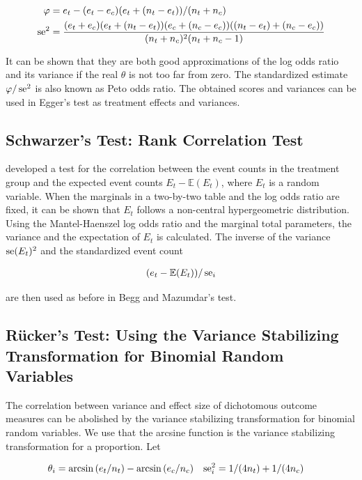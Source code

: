 \documentclass[11pt,a4paper,twoside]{book}\usepackage[]{graphicx}\usepackage[]{color}
\begin{document}
\begin{align}
\varphi &= e_t - (e_t - e_c)(e_t + (n_t - e_t))/(n_t + n_c) \nonumber \\
 \operatorname{se}^2 &= \frac{(e_t + e_c)(e_t + (n_t - e_t))(e_c + (n_c - e_c))((n_t - e_t) + (n_c - e_c))}{(n_t + n_c)^2(n_t + n_c - 1)} \nonumber
\end{align}

It can be shown that they are both good approximations of the log odds ratio and its variance if the real $\theta$ is not too far from zero. The standardized estimate $\varphi/\operatorname{se}^2$ is also known as Peto odds ratio. The obtained scores and variances can be used in Egger's test as treatment effects and variances.


\subsection{Schwarzer's Test: Rank Correlation Test} \label{sec:Schwarzer}
\citealp{Schwarzer} developed a test for the correlation between the event counts in the treatment group and the expected event counts $E_t - \mathbb{E}(E_t)$, where $E_t$ is a random variable. When the marginals in a two-by-two table and the log odds ratio are fixed, it can be shown that $E_t$ follows a non-central hypergeometric distribution. Using the Mantel-Haenszel log odds ratio and the marginal total parameters, the variance and the expectation of $E_t$ is calculated. The inverse of the variance $\operatorname{se}(E_t)^2$ and the standardized event count

\begin{align}
(e_t - \mathbb{E}(E_t))/\operatorname{se}_i
\end{align}

are then used as before in Begg and Mazumdar's test.

\subsection{R\"ucker's Test: Using the Variance Stabilizing Transformation for Binomial Random Variables} \label{sec:Rucker}
The correlation between variance and effect size of dichotomous outcome measures can be abolished by the variance stabilizing transformation for binomial random variables. We use that the arcsine function is the variance stabilizing transformation for a proportion. Let

\begin{align}
\theta_i &= \arcsin{(e_t/n_t)} - \arcsin{(e_c/n_c)} \nonumber &
\operatorname{se}_i^2 &= 1/(4n_t) + 1/(4n_c) \nonumber
\end{align}
\end{document}
